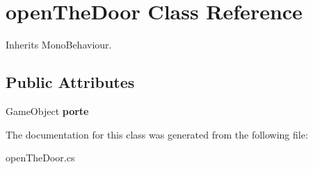 \hypertarget{classopen_the_door}{\section{open\+The\+Door Class Reference}
\label{classopen_the_door}
}


Inherits Mono\+Behaviour.

\subsection*{Public Attributes}
\begin{DoxyCompactItemize}
\item 
\hypertarget{classopen_the_door_a36a27f2c78d26c8f3753b25af91705b7}{Game\+Object {\bfseries porte}}\label{classopen_the_door_a36a27f2c78d26c8f3753b25af91705b7}

\end{DoxyCompactItemize}


The documentation for this class was generated from the following file\+:\begin{DoxyCompactItemize}
\item 
open\+The\+Door.\+cs\end{DoxyCompactItemize}
